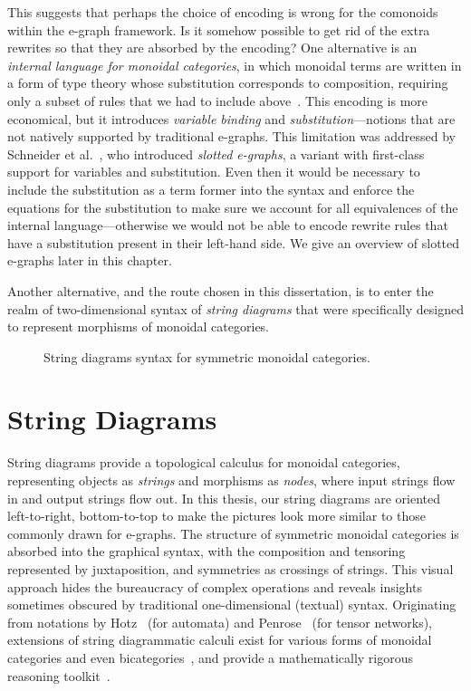 This suggests that perhaps the choice of encoding is wrong for the comonoids within the e-graph framework.
Is it somehow possible to get rid of the extra rewrites so that they are absorbed by the encoding?
One alternative is an \emph{internal language for monoidal categories}, in which monoidal terms are written in a form of type theory whose substitution corresponds to composition, requiring only a subset of rules that we had to include above~\cite{shulman2016categorical}.
This encoding is more economical, but it introduces \emph{variable binding} and \emph{substitution}---notions that are not natively supported by traditional e-graphs.
This limitation was addressed by Schneider et al.~\cite{slotted-egraphs}, who introduced \emph{slotted e-graphs}, a variant with first-class support for variables and substitution.
Even then it would be necessary to include the substitution as a term former into the syntax and enforce the equations for the substitution to make sure we account for all equivalences of the internal language---otherwise we would not be able to encode rewrite rules that have a substitution present in their left-hand side.  
We give an overview of slotted e-graphs later in this chapter.

Another alternative, and the route chosen in this dissertation, is to enter the realm of two-dimensional syntax of \emph{string diagrams} that were specifically designed to represent morphisms of monoidal categories.

\begin{figure}
    \centering
    \caption{String diagrams syntax for symmetric monoidal categories.}
    \label{fig:string-diagram-syntax}
\end{figure}

\section*{String Diagrams}

String diagrams provide a topological calculus for monoidal categories, representing objects as \emph{strings} and morphisms as \emph{nodes}, where input strings flow in and output strings flow out.
In this thesis, our string diagrams are oriented left-to-right, bottom-to-top to make the pictures look more similar to those commonly drawn for e-graphs.
The structure of symmetric monoidal categories is absorbed into the graphical syntax, with the composition and tensoring represented by juxtaposition, and symmetries as crossings of strings.
This visual approach hides the bureaucracy of complex operations and reveals insights sometimes obscured by traditional one-dimensional (textual) syntax.
Originating from notations by Hotz~\cite{hotzsd} (for automata) and Penrose~\cite{penrose1984spinors} (for tensor networks), extensions of string diagrammatic calculi exist for various forms of monoidal categories and even bicategories~\cite{Selinger_2010}, and provide a mathematically rigorous reasoning toolkit~\cite{joyal_geometry_1991}.

